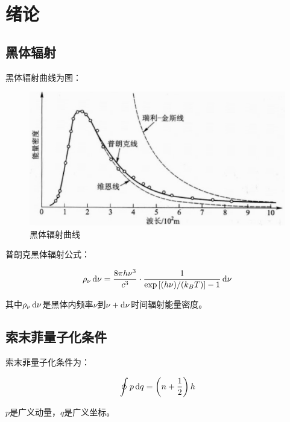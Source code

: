 \section{绪论}

\subsection{黑体辐射}

黑体辐射曲线为图：

\begin{figure}[H]
  \centering
  \includegraphics[width=0.65\linewidth]{figures/黑体辐射曲线}
  \caption{黑体辐射曲线}
  \label{fig:黑体辐射曲线}
\end{figure}

普朗克黑体辐射公式：

\begin{equation*}
  \begin{aligned}
    \rho_{\nu} \mathop{}\!\mathrm{d} \nu = \dfrac{8 \pi h \nu^3}{c^3} \cdot \dfrac{1}{\exp \left[ (h \nu) / (k_B T)  \right] - 1} \mathop{}\!\mathrm{d} \nu  
  \end{aligned}
\end{equation*}

其中$\rho_{\nu} \mathop{}\!\mathrm{d} \nu$是黑体内频率$\nu$到$\nu + \mathop{}\!\mathrm{d} \nu$时间辐射能量密度。

\subsection{索末菲量子化条件}

索末菲量子化条件为：

\begin{equation*}
  \begin{aligned}
    \oint p \mathop{}\!\mathrm{d} q = \left( n + \dfrac{1}{2}  \right) h
  \end{aligned}
\end{equation*}

$p$是广义动量，$q$是广义坐标。


